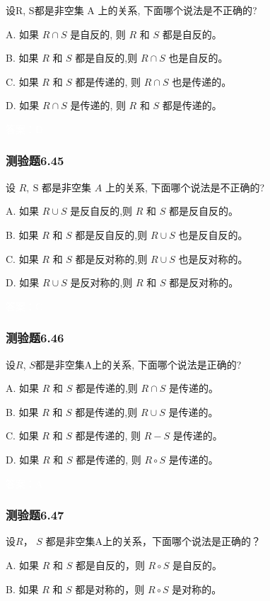 \documentclass[UTF8, heading=true]{ctexart}
\begin{document}
设R, S都是非空集 A 上的关系, 下面哪个说法是不正确的?

A. 
如果 $R \cap S$ 是自反的, 则 $R$ 和 $S$ 都是自反的。

B. 
如果 $R$ 和 $S$ 都是自反的,则 $R \cap S$ 也是自反的。

C. 
如果 $R$ 和 $S$ 都是传递的, 则 $R \cap S$ 也是传递的。

D. 
如果 $R \cap S$ 是传递的, 则 $R$ 和 $S$ 都是传递的。

\textcolor{white}{答案：D}

\subsubsection{测验题6.45}

设 $R, \mathrm{~S}$ 都是非空集 $A$ 上的关系, 下面哪个说法是不正确的?

A. 如果 $R \cup S$ 是反自反的,则 $R$ 和 $S$ 都是反自反的。

B. 如果 $R$ 和 $S$ 都是反自反的,则 $R \cup S$ 也是反自反的。

C. 如果 $R$ 和 $S$ 都是反对称的,则 $R \cup S$ 也是反对称的。

D. 如果 $R \cup S$ 是反对称的,则 $R$ 和 $S$ 都是反对称的。

\textcolor{white}{答案：C}


\subsubsection{测验题6.46}

设$R$, $S$都是非空集A上的关系, 下面哪个说法是正确的?

A. 
如果 $R$ 和 $S$ 都是传递的,则 $R \cap S$ 是传递的。

B. 
如果 $R$ 和 $S$ 都是传递的,则 $R \cup S$ 是传递的。

C. 
如果 $R$ 和 $S$ 都是传递的, 则 $R-S$ 是传递的。

D. 
如果 $R$ 和 $S$ 都是传递的, 则 $R \circ S$ 是传递的。

\textcolor{white}{答案：A}

\subsubsection{测验题6.47}

设$R$， $S$ 都是非空集A上的关系，下面哪个说法是正确的？

A. 如果 $R$ 和 $S$ 都是自反的，则 $R \circ S$ 是自反的。

B. 
如果 $R$ 和 $S$ 都是对称的，则 $R \circ S$ 是对称的。
\end{document}
